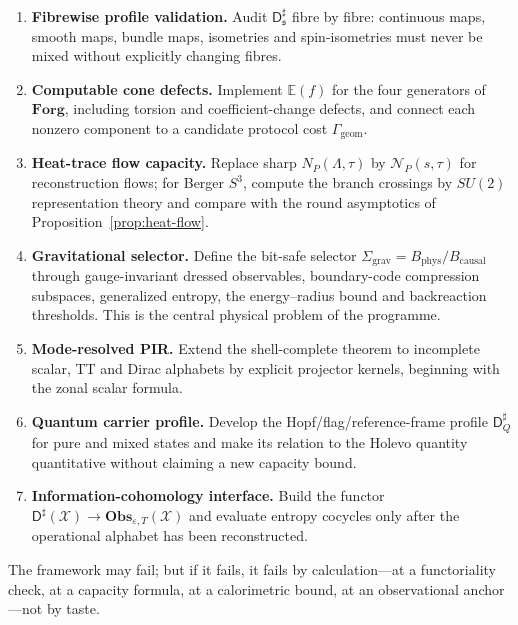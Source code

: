 \documentclass[11pt,a4paper]{article}
\theoremstyle{definition}
\theoremstyle{remark}
\newcommand{\Sthree}{S^{3}}
\newcommand{\Dsharp}{\mathsf{D}^{\sharp}}
\newcommand{\Forg}{\mathbf{Forg}}
\newcommand{\Bphys}{B_{\mathrm{phys}}}
\newcommand{\Bcausal}{B_{\mathrm{causal}}}
\begin{document}
\begin{enumerate}[label=\textbf{OP\arabic*.},leftmargin=2.2em]
\item \textbf{Fibrewise profile validation.}  Audit $\Dsharp_{\mathfrak s}$ fibre by fibre:
continuous maps, smooth maps, bundle maps, isometries and spin-isometries must never be mixed
without explicitly changing fibres.
\item \textbf{Computable cone defects.}  Implement $\mathbb E(f)$ for the four generators of
$\Forg$, including torsion and coefficient-change defects, and connect each nonzero component
to a candidate protocol cost $\Gamma_{\mathrm{geom}}$.
\item \textbf{Heat-trace flow capacity.}  Replace sharp $N_P(\Lambda,\tau)$ by
$\mathcal N_P(s,\tau)$ for reconstruction flows; for Berger $\Sthree$, compute the branch
crossings by $SU(2)$ representation theory and compare with the round asymptotics of
Proposition~\ref{prop:heat-flow}.
\item \textbf{Gravitational selector.}  Define the bit-safe selector
$\Sigma_{\mathrm{grav}}=\Bphys/\Bcausal$ through gauge-invariant dressed observables,
boundary-code compression subspaces, generalized entropy, the energy--radius bound and
backreaction thresholds.  This is the central physical
problem of the programme.
\item \textbf{Mode-resolved PIR.}  Extend the shell-complete theorem to incomplete scalar, TT
and Dirac alphabets by explicit projector kernels, beginning with the zonal scalar formula.
\item \textbf{Quantum carrier profile.}  Develop the Hopf/flag/reference-frame profile
$\Dsharp_Q$ for pure and mixed states and make its relation to the Holevo quantity quantitative
without claiming a new capacity bound.
\item \textbf{Information-cohomology interface.}  Build the functor
$\Dsharp(\mathcal X)\to\mathbf{Obs}_{\varepsilon,T}(\mathcal X)$ and evaluate entropy cocycles
only after the operational alphabet has been reconstructed.
\end{enumerate}

The framework may fail; but if it fails, it fails by calculation---at a functoriality check,
at a capacity formula, at a calorimetric bound, at an observational anchor---not by taste.
\end{document}
